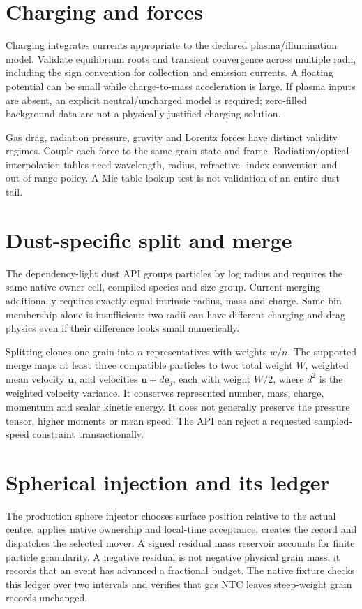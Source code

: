 \section{Charging and forces}
Charging integrates currents appropriate to the declared plasma/illumination
model. Validate equilibrium roots and transient convergence across multiple
radii, including the sign convention for collection and emission currents.
A floating potential can be small while charge-to-mass acceleration is large.
If plasma inputs are absent, an explicit neutral/uncharged model is required;
zero-filled background data are not a physically justified charging solution.

Gas drag, radiation pressure, gravity and Lorentz forces have distinct
validity regimes. Couple each force to the same grain state and frame.
Radiation/optical interpolation tables need wavelength, radius, refractive-
index convention and out-of-range policy. A Mie table lookup test is not
validation of an entire dust tail.

\section{Dust-specific split and merge}
The dependency-light dust API groups particles by log radius and requires the
same native owner cell, compiled species and size group. Current merging
additionally requires exactly equal intrinsic radius, mass and charge.
Same-bin membership alone is insufficient: two radii can have different
charging and drag physics even if their difference looks small numerically.

Splitting clones one grain into $n$ representatives with weights $w/n$.
The supported merge maps at least three compatible particles to two:
total weight $W$, weighted mean velocity $\boldsymbol u$, and velocities
$\boldsymbol u\pm d\boldsymbol e_j$, each with weight $W/2$, where
$d^2$ is the weighted velocity variance. It conserves represented number,
mass, charge, momentum and scalar kinetic energy. It does not generally
preserve the pressure tensor, higher moments or mean speed. The API can
reject a requested sampled-speed constraint transactionally.


\section{Spherical injection and its ledger}
The production sphere injector chooses surface position relative to the
actual centre, applies native ownership and local-time acceptance, creates
the record and dispatches the selected mover. A signed residual mass reservoir
accounts for finite particle granularity. A negative residual is not negative
physical grain mass; it records that an event has advanced a fractional budget.
The native fixture checks this ledger over two intervals and verifies that
gas NTC leaves steep-weight grain records unchanged.
